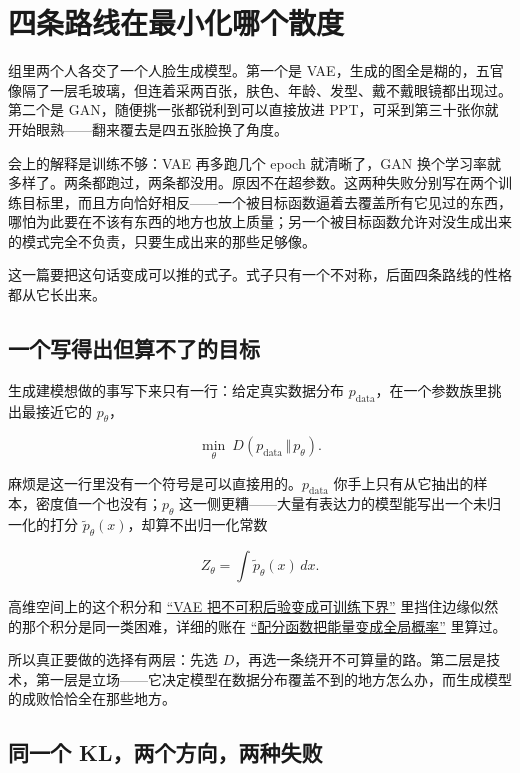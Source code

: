 \section{四条路线在最小化哪个散度}
\label{sec:14-Deep-Learning/07-Generative-Models-Unified/01}

组里两个人各交了一个人脸生成模型。第一个是 VAE，生成的图全是糊的，五官像隔了一层毛玻璃，但连着采两百张，肤色、年龄、发型、戴不戴眼镜都出现过。第二个是 GAN，随便挑一张都锐利到可以直接放进 PPT，可采到第三十张你就开始眼熟——翻来覆去是四五张脸换了角度。

会上的解释是训练不够：VAE 再多跑几个 epoch 就清晰了，GAN 换个学习率就多样了。两条都跑过，两条都没用。原因不在超参数。这两种失败分别写在两个训练目标里，而且方向恰好相反——一个被目标函数逼着去覆盖所有它见过的东西，哪怕为此要在不该有东西的地方也放上质量；另一个被目标函数允许对没生成出来的模式完全不负责，只要生成出来的那些足够像。

这一篇要把这句话变成可以推的式子。式子只有一个不对称，后面四条路线的性格都从它长出来。

\subsection{一个写得出但算不了的目标}

生成建模想做的事写下来只有一行：给定真实数据分布 \(p_{\text{data}}\)，在一个参数族里挑出最接近它的 \(p_\theta\)，

\[
\min_\theta\ D(p_{\text{data}}\,\Vert\,p_\theta).
\]

麻烦是这一行里没有一个符号是可以直接用的。\(p_{\text{data}}\) 你手上只有从它抽出的样本，密度值一个也没有；\(p_\theta\) 这一侧更糟——大量有表达力的模型能写出一个未归一化的打分 \(\tilde p_\theta(x)\)，却算不出归一化常数

\[
Z_\theta=\int \tilde p_\theta(x)\,dx.
\]

高维空间上的这个积分和 \hyperref[sec:14-Deep-Learning/06-Variational-Autoencoders/01]{``VAE 把不可积后验变成可训练下界''} 里挡住边缘似然的那个积分是同一类困难，详细的账在 \hyperref[sec:13-Machine-Learning/08-Sampling-and-Inference/06]{``配分函数把能量变成全局概率''} 里算过。

所以真正要做的选择有两层：先选 \(D\)，再选一条绕开不可算量的路。第二层是技术，第一层是立场——它决定模型在数据分布覆盖不到的地方怎么办，而生成模型的成败恰恰全在那些地方。

\subsection{同一个 KL，两个方向，两种失败}

